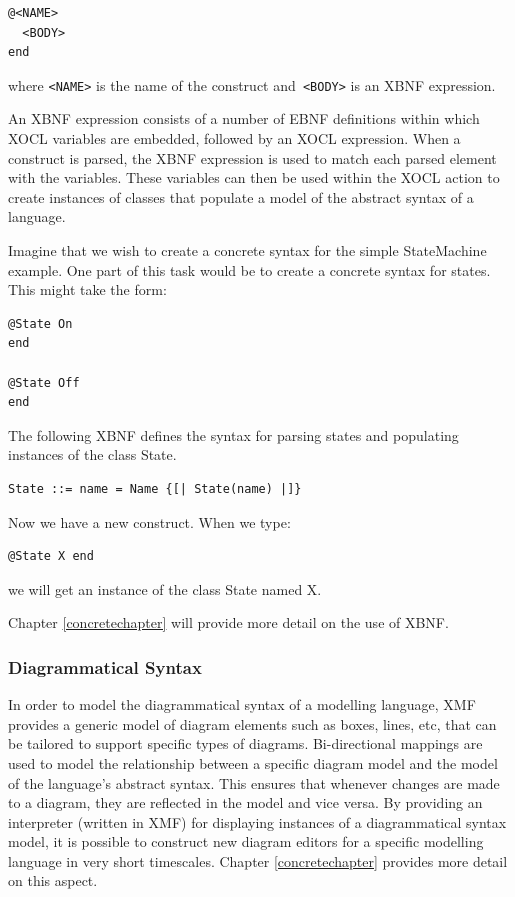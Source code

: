 \begin{lstlisting}
@<NAME>
  <BODY>
end
\end{lstlisting}
\noindent where {\tt <NAME>} is the name of the construct and{\tt
<BODY>} is an XBNF expression.

An XBNF expression consists of a number of EBNF definitions within
which XOCL variables are embedded, followed by an XOCL expression.
When a construct is parsed, the XBNF expression is used to match
each parsed element with the variables. These variables can then
be used within the XOCL action to create instances of classes that
populate a model of the abstract syntax of a language.

Imagine that we wish to create a concrete syntax for the simple
StateMachine example. One part of this task would be to create a
concrete syntax for states. This might take the form:

\begin{lstlisting}
@State On
end

@State Off
end
\end{lstlisting}The following XBNF defines the syntax for parsing states and
populating instances of the class State.

\begin{lstlisting}
State ::= name = Name {[| State(name) |]}
\end{lstlisting}\noindent Now we have a new construct. When we type:

\begin{lstlisting}
@State X end
\end{lstlisting}\noindent we will get an instance of the class State named X.

\noindent Chapter \ref{concretechapter} will provide more detail
on the use of XBNF.

\subsubsection{Diagrammatical Syntax}

In order to model the diagrammatical syntax of a modelling
language, XMF provides a generic model of diagram elements such as
boxes, lines, etc, that can be tailored to support specific types
of diagrams. Bi-directional mappings are used to model the
relationship between a specific diagram model and the model of the
language's abstract syntax. This ensures that whenever changes are
made to a diagram, they are reflected in the model and vice versa.
By providing an interpreter (written in XMF) for displaying
instances of a diagrammatical syntax model, it is possible to
construct new diagram editors for a specific modelling language in
very short timescales. Chapter \ref{concretechapter} provides more
detail on this aspect.

